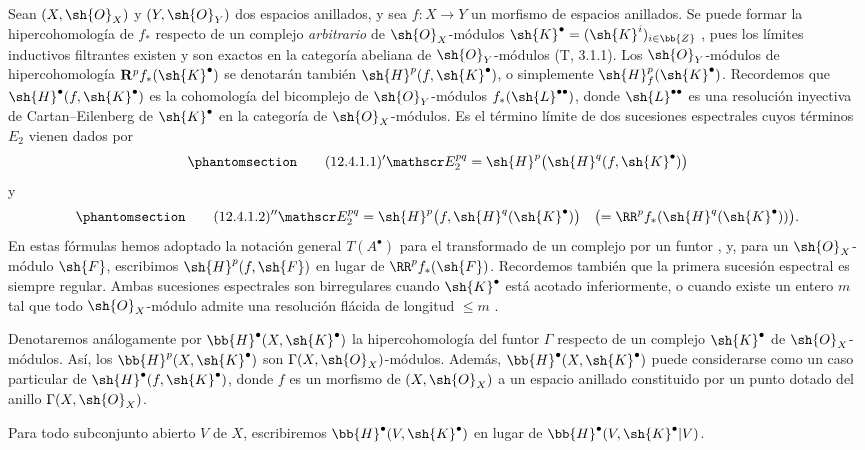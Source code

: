 \documentclass[oneside]{amsart}
\renewcommand*{\mathcal}{\mathscr}
\renewcommand{\leq}{\leqslant}
\newcommand{\oldpage}[2][]{{\marginnote{\normalfont\textbf{#1}~|~#2}}\ignorespaces}
\let\EGAOriginalLabel\label
\renewcommand{\label}[1]{\phantomsection\EGAOriginalLabel{#1}}
\begin{document}
\begin{env}[12.4.1]
\label{0.12.4.1}
Sean $(X,\sh{O}_X)$ y $(Y,\sh{O}_Y)$ dos espacios anillados, y sea
$f:X\longrightarrow Y$ un morfismo de espacios anillados.
Se puede formar la hipercohomología de $f_*$ respecto de un complejo
\emph{arbitrario} de $\sh{O}_X$-módulos
$\sh{K}^\bullet=(\sh{K}^i)_{i\in\bb{Z}}$
, pues los límites inductivos filtrantes existen y son exactos
en la categoría abeliana de $\sh{O}_Y$-módulos (T, 3.1.1).
Los $\sh{O}_Y$-módulos de hipercohomología
$\mathbf{R}^p f_*(\sh{K}^\bullet)$ se denotarán también
$\sh{H}^p(f,\sh{K}^\bullet)$, o simplemente
$\sh{H}^p_f(\sh{K}^\bullet)$.
Recordemos que $\sh{H}^\bullet(f,\sh{K}^\bullet)$ es la cohomología del
bicomplejo de $\sh{O}_Y$-módulos $f_*(\sh{L}^{\bullet\bullet})$,
donde $\sh{L}^{\bullet\bullet}$ es una resolución inyectiva de
Cartan--Eilenberg de $\sh{K}^\bullet$ en la categoría de
$\sh{O}_X$-módulos.
Es el término límite de dos sucesiones espectrales cuyos términos $E_2$
vienen dados por
\begin{equation}
\label{0.12.4.1.1}
\tag{12.4.1.1}
  {}'\mathcal E_2^{pq}
  =\sh{H}^p\bigl(\sh{H}^q(f,\sh{K}^\bullet)\bigr)
\end{equation}
y
\begin{equation}
\label{0.12.4.1.2}
\tag{12.4.1.2}
  {}''\mathcal E_2^{pq}
  =\sh{H}^p\bigl(f,\sh{H}^q(\sh{K}^\bullet)\bigr)
  \quad
  \bigl(=\RR^p f_*(\sh{H}^q(\sh{K}^\bullet))\bigr).
\end{equation}
En estas fórmulas hemos adoptado la notación general $T(A^\bullet)$
para el transformado de un complejo por un funtor , y, para
un $\sh{O}_X$-módulo $\sh{F}$, escribimos
$\sh{H}^p(f,\sh{F})$ en lugar de $\RR^p f_*(\sh{F})$.
Recordemos también que la primera sucesión espectral es siempre regular.
Ambas sucesiones espectrales son birregulares cuando $\sh{K}^\bullet$ está
acotado inferiormente,
\oldpage[0\textsubscript{III}]{63}
o cuando existe un entero $m$ tal que todo $\sh{O}_X$-módulo
admite una resolución flácida de longitud $\leq m$ .
\end{env}

\begin{env}[12.4.2]
\label{0.12.4.2}
Denotaremos análogamente por $\bb{H}^\bullet(X,\sh{K}^\bullet)$ la
hipercohomología del funtor $\Gamma$ respecto de un complejo
$\sh{K}^\bullet$ de $\sh{O}_X$-módulos.
Así, los $\bb{H}^p(X,\sh{K}^\bullet)$ son
$\Gamma(X,\sh{O}_X)$-módulos.
Además, $\bb{H}^\bullet(X,\sh{K}^\bullet)$ puede considerarse como un
caso particular de $\sh{H}^\bullet(f,\sh{K}^\bullet)$, donde $f$ es un
morfismo de $(X,\sh{O}_X)$ a un espacio anillado constituido por un punto
dotado del anillo $\Gamma(X,\sh{O}_X)$.

Para todo subconjunto abierto $V$ de $X$, escribiremos
$\bb{H}^\bullet(V,\sh{K}^\bullet)$ en lugar de
$\bb{H}^\bullet(V,\sh{K}^\bullet|V)$.
\end{env}
\end{document}
